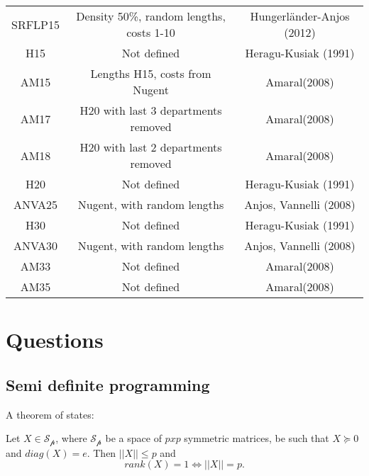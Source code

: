 \documentclass[a4paper]{article}
\begin{document}
\begin{table}
\begin{tabular}{c|c|c}
        SRFLP15 & Density 50\%, random lengths, costs 1-10 & Hungerländer-Anjos (2012) \\
        H15 & Not defined & Heragu-Kusiak (1991) \\
        AM15 & Lengths H15, costs from Nugent & Amaral(2008) \\
        AM17 & H20 with last 3 departments removed & Amaral(2008) \\
        AM18 & H20 with last 2 departments removed & Amaral(2008) \\
        H20 & Not defined & Heragu-Kusiak (1991) \\
        ANVA25 & Nugent, with random lengths & Anjos, Vannelli (2008) \\
        H30 & Not defined & Heragu-Kusiak (1991) \\
        ANVA30 & Nugent, with random lengths & Anjos, Vannelli (2008) \\
        AM33 & Not defined & Amaral(2008) \\
        AM35 & Not defined & Amaral(2008) 
    \end{tabular}
\end{table}

\section{Questions}
\subsection{Semi definite programming}
A theorem of \cite{Malick2007} states:
\begin{theorem}
    Let $X \in \mathcal{S_p}$, where $\mathcal{S_p}$ be a space of $p x p$ symmetric matrices, be such that $X \succcurlyeq 0$ and $diag(X) = e$. Then $||X|| \leq p$ and
    \begin{equation*}
        rank(X) = 1  \Longleftrightarrow ||X|| = p.
    \end{equation*}
\end{theorem}
\end{document}
